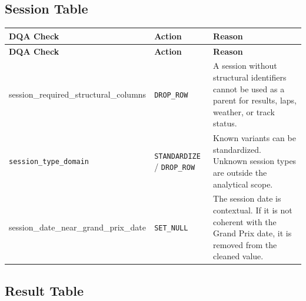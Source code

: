 \documentclass[a4paper,11pt]{article}
\begin{document}
	\subsection{Session Table}
	
	\begin{longtable}{p{6cm}p{2.5cm}p{6.4cm}}
		\toprule
		\textbf{DQA Check} & \textbf{Action} & \textbf{Reason} \\
		\midrule
		\endfirsthead
		
		\toprule
		\textbf{DQA Check} & \textbf{Action} & \textbf{Reason} \\
		\midrule
		\endhead
		
		\small{session\_required\_structural\_columns}
		& \texttt{DROP\_ROW}
		& A session without structural identifiers cannot be used as a parent for results, laps, weather, or track status. \\
		\midrule
		
		\texttt{session\_type\_domain}
		& \texttt{STANDARDIZE} / \texttt{DROP\_ROW}
		& Known variants can be standardized. Unknown session types are outside the analytical scope. \\
		\midrule
		
		\small{session\_date\_near\_grand\_prix\_date}
		& \texttt{SET\_NULL}
		& The session date is contextual. If it is not coherent with the Grand Prix date, it is removed from the cleaned value. \\
		\bottomrule
	\end{longtable}
	
	\subsection{Result Table}
	
\end{document}
